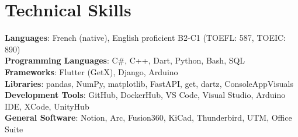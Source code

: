\documentclass[letterpaper,11pt]{article}
\begin{document}
\section{Technical Skills}
 \begin{itemize}[leftmargin=0.15in, label={}]
    \small{\item{
     \textbf{Languages}{: French (native), English proficient B2-C1 (TOEFL: 587, TOEIC: 890)} \\
     \textbf{Programming Languages}{: C\#, C++, Dart, Python, Bash, SQL} \\
     \textbf{Frameworks}{: Flutter (GetX), Django, Arduino} \\
     \textbf{Libraries}{: pandas, NumPy, matplotlib, FastAPI, get, dartz, ConsoleAppVisuals} \\
     \textbf{Development Tools}{: GitHub, DockerHub, VS Code, Visual Studio, Arduino IDE, XCode, UnityHub} \\
     \textbf{General Software}{: Notion, Arc, Fusion360, KiCad, Thunderbird, UTM, Office Suite}
    }}
 \end{itemize}
\end{document}

